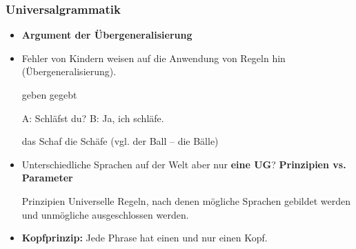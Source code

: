\begin{frame}
\frametitle{Universalgrammatik}

\begin{itemize}
	\item \textbf{Argument der Übergeneralisierung}
	\medskip
	\item Fehler von Kindern weisen auf die Anwendung von Regeln hin (Übergeneralisierung).

\pause	
	\eal 
	\ex geben
	\ex gegebt
	\zl
	
	\eal 
	\ex A: Schläfst du?
	\ex B: Ja, ich schläfe.
	\zl
	
	\eal 
	\ex das Schaf
	\ex die Schäfe (vgl. der Ball -- die Bälle)
	\zl

\end{itemize}

\end{frame}


\begin{frame}

\begin{itemize}
	\item Unterschiedliche Sprachen auf der Welt aber nur \textbf{eine UG}? \ras \textbf{Prinzipien vs. Parameter}

	\begin{block}{Prinzipien}
	Universelle Regeln, nach denen mögliche Sprachen gebildet werden und unmögliche ausgeschlossen werden. 
	\end{block}
	
	\item \textbf{Kopfprinzip:} Jede Phrase hat einen und nur einen Kopf.

\pause
	\eal 
	\zl
	
\end{itemize}

\end{frame}


